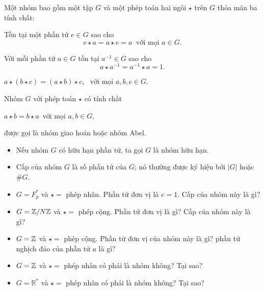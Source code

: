 \begin{frame}
	\begin{dfntn}
		Một nhóm bao gồm một tập $G$ và một phép toán hai ngôi $\star$ trên $G$ thỏa mãn ba tính chất:
		\begin{description}
			\item<+->[ Có đơn vị: ] Tồn tại một phần tử $e \in G$ sao cho $$e\star a = a\star e = a\ \text{ với mọi } a \in G.$$
			
			\item<+->[ Có nghịch đảo: ] Với mỗi phần tử $a \in G$ tồn tại $a^{-1} \in G$ sao cho
			$$
			a \star a^{-1} = a^{-1} \star a = 1.
			$$ 
			\item<+->[ Kết hợp:  ] $a\star (b\star c) = (a\star b)\star c$,\ $\text{ với mọi } a,b,c \in G$.
		\end{description}
	\end{dfntn}
\end{frame}

\begin{frame}
	\begin{dfntn}
		Nhóm $G$ với phép toán $\star$ có  tính chất 
		\begin{description}
			\item<+->[ Giao hoán: ] $a \star b = b \star a$\  với mọi  $a,b \in G$,
		\end{description}
		được gọi là nhóm giao hoán hoặc nhóm Abel.
	\end{dfntn}
\end{frame}

\begin{frame}
	\begin{dfntn}
		\begin{itemize}
			\item<+-> Nếu nhóm $G$ có hữu hạn phần tử, ta gọi $G$ là nhóm hữu hạn. 
			\item<+-> Cấp của nhóm $G$ là số phần tử của $G$; nó thường được ký hiệu bởi $|G|$ hoặc $\#G$.
		\end{itemize}
	\end{dfntn}
\end{frame}

\begin{frame}
	\begin{xmpl}
		\begin{itemize}
			\item<+-> $G=F_p^*$ và $\star=$ phép nhân. Phần tử đơn vị là $e=1$. Cấp của nhóm này là gì?
			\item<+-> $G=\mathbb{Z}/N\mathbb{Z}$ và  $\star=$ phép cộng. Phần tử đơn vị là gì? Cấp của nhóm này là gì?
			\item<+-> $G = \mathbb{Z}$ và  $\star=$ phép cộng. Phần tử đơn vị của nhóm này là gì?  phần tử nghịch đảo của phần tử $a$ là gì? 
			\item<+-> $G = \mathbb{Z}$ và $\star=$ phép nhân có phải là nhóm không? Tại sao?
			\item<+-> $G = \mathbb{R}^*$ và $\star=$ phép nhân có phải là nhóm không? Tại sao?
		\end{itemize}
	\end{xmpl}
	
\end{frame}

